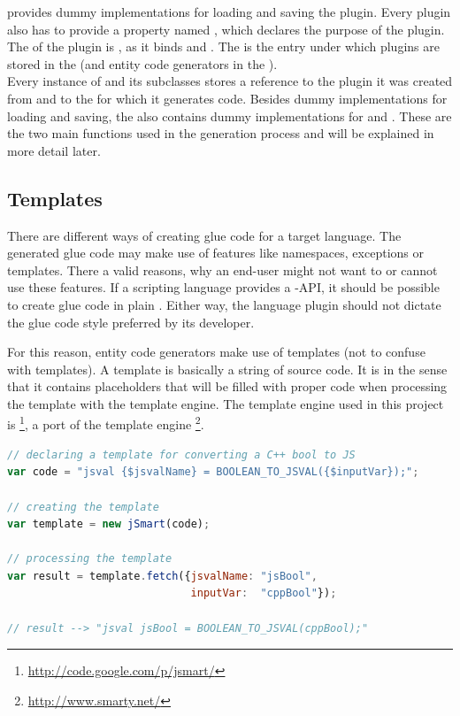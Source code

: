  provides dummy implementations for loading and saving the plugin. Every plugin also has to provide a property named , which declares the purpose of the plugin. The  of the  plugin is , as it binds  and . The  is the entry under which plugins are stored in the  (and entity code generators in the ).
\\Every instance of  and its subclasses stores a reference to the plugin it was created from and to the  for which it generates code. Besides dummy implementations for loading and saving, the  also contains dummy implementations for  and . These are the two main functions used in the generation process and will be explained in more detail later.

\subsection{Templates}

There are different ways of creating glue code for a target language. The generated glue code may make use of  features like namespaces, exceptions or templates. There a valid reasons, why an end-user might not want to or cannot use these features. If a scripting language provides a -API, it should be possible to create glue code in plain . Either way, the language plugin should not dictate the glue code style preferred by its developer.

For this reason, entity code generators make use of templates (not to confuse with  templates). A template is basically a string of  source code. It is  in the sense that it contains placeholders that will be filled with proper code when processing the template with the template engine. The template engine used in this project is \footnote{\url{http://code.google.com/p/jsmart/}}, a  port of the  template engine \footnote{\url{http://www.smarty.net/}}.

\SingleSpacing
\begin{lstlisting}[language=JavaScript, caption=Template for converting a \mySCName{bool} to \myProperName{JavaScript} in \myProperName{Spidermonkey}, label=lst:TemplateBool]
// declaring a template for converting a C++ bool to JS
var code = "jsval {$jsvalName} = BOOLEAN_TO_JSVAL({$inputVar});";

// creating the template
var template = new jSmart(code);

// processing the template
var result = template.fetch({jsvalName: "jsBool", 
                             inputVar:  "cppBool"});
                             
// result --> "jsval jsBool = BOOLEAN_TO_JSVAL(cppBool);"
\end{lstlisting}
\OnehalfSpacing

